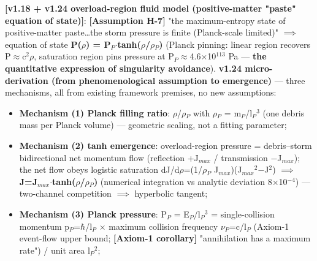 \documentclass[12pt]{article}
\newcommand{\mtag}[1]{\textbf{[#1]}}
\newcommand{\up}[1]{\ensuremath{^{#1}}}
\newcommand{\down}[1]{\ensuremath{_{#1}}}
\begin{document}
\textbf{\mtag{v1.18 + v1.24 overload-region fluid model (positive-matter "paste" equation of state)}}: \mtag{Assumption H-7} "the maximum-entropy state of positive-matter paste\ldots the storm pressure is finite (Planck-scale limited)" \ensuremath{\implies} equation of state \textbf{P(\ensuremath{\rho}) = P\down{P}\ensuremath{\cdot}tanh(\ensuremath{\rho}/\ensuremath{\rho}\down{P})} (Planck pinning: linear region recovers P\ensuremath{\approx}c\up{2}\ensuremath{\rho}, saturation region pins pressure at P\down{P}\ensuremath{\approx}4.6\ensuremath{\times}10\up{113} Pa --- \textbf{the quantitative expression of singularity avoidance}). \textbf{v1.24 micro-derivation (from phenomenological assumption to emergence)} --- three mechanisms, all from existing framework premises, no new assumptions:
\begin{itemize}
\item \textbf{Mechanism (1) Planck filling ratio}: \ensuremath{\rho}/\ensuremath{\rho}\down{P} with \ensuremath{\rho}\down{P} = m\down{P}/l\down{P}\up{3} (one debris mass per Planck volume) --- geometric scaling, not a fitting parameter;
\item \textbf{Mechanism (2) tanh emergence}: overload-region pressure = debris--storm bidirectional net momentum flow (reflection +J\down{max} / transmission \ensuremath{-}J\down{max}); the net flow obeys logistic saturation dJ/d\ensuremath{\rho}=(1/\ensuremath{\rho}\down{P} J\down{max})(J\down{max}\up{2}\ensuremath{-}J\up{2}) \ensuremath{\implies} \textbf{J=J\down{max}\ensuremath{\cdot}tanh(\ensuremath{\rho}/\ensuremath{\rho}\down{P})} (numerical integration vs analytic deviation 8\ensuremath{\times}10\up{-4}) --- two-channel competition \ensuremath{\implies} hyperbolic tangent;
\item \textbf{Mechanism (3) Planck pressure}: P\down{P} = E\down{P}/l\down{P}\up{3} = single-collision momentum p\down{P}=\ensuremath{\hbar}/l\down{P} \ensuremath{\times} maximum collision frequency \ensuremath{\nu}\down{P}=c/l\down{P} (Axiom-1 event-flow upper bound; \mtag{Axiom-1 corollary} "annihilation has a maximum rate") / unit area l\down{P}\up{2};

\end{itemize}
\end{document}

